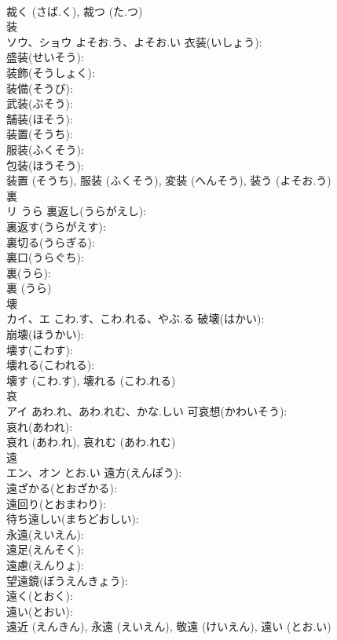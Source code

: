 \documentclass[8pt]{extreport}
\begin{document}
\begin{CJK}{UTF8}{min}
\\	裁く (さば.く), 裁つ (た.つ)
\\	装		
\\	ソウ、ショウ	よそお.う、よそお.い	衣装(いしょう): 
\\	盛装(せいそう): 
\\	装飾(そうしょく): 
\\	装備(そうび): 
\\	武装(ぶそう): 
\\	舗装(ほそう): 
\\	装置(そうち): 
\\	服装(ふくそう): 
\\	包装(ほうそう): 
\\	装置 (そうち), 服装 (ふくそう), 変装 (へんそう), 装う (よそお.う)
\\	裏			
\\	リ	うら	裏返し(うらがえし): 
\\	裏返す(うらがえす): 
\\	裏切る(うらぎる): 
\\	裏口(うらぐち): 
\\	裏(うら): 
\\	裏 (うら)
\\	壊		
\\	カイ、エ	こわ.す、こわ.れる、やぶ.る	破壊(はかい): 
\\	崩壊(ほうかい): 
\\	壊す(こわす): 
\\	壊れる(こわれる): 
\\	壊す (こわ.す), 壊れる (こわ.れる)
\\	哀			
\\	アイ	あわ.れ、あわ.れむ、かな.しい	可哀想(かわいそう): 
\\	哀れ(あわれ): 
\\	哀れ (あわ.れ), 哀れむ (あわ.れむ)
\\	遠			
\\	エン、オン	とお.い	遠方(えんぽう): 
\\	遠ざかる(とおざかる): 
\\	遠回り(とおまわり): 
\\	待ち遠しい(まちどおしい): 
\\	永遠(えいえん): 
\\	遠足(えんそく): 
\\	遠慮(えんりょ): 
\\	望遠鏡(ぼうえんきょう): 
\\	遠く(とおく): 
\\	遠い(とおい): 
\\	遠近 (えんきん), 永遠 (えいえん), 敬遠 (けいえん), 遠い (とお.い)

\end{CJK}
\end{document}
